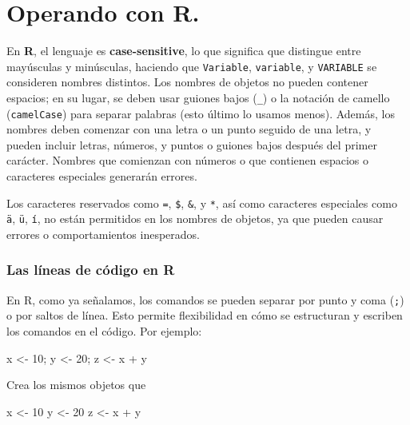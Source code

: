\documentclass[
  letterpaper,
]{scrbook}
\newenvironment{Shaded}{\begin{snugshade}}{\end{snugshade}}
\newcommand{\DecValTok}[1]{\textcolor[rgb]{0.68,0.00,0.00}{#1}}
\newcommand{\NormalTok}[1]{\textcolor[rgb]{0.00,0.23,0.31}{#1}}
\newcommand{\OtherTok}[1]{\textcolor[rgb]{0.00,0.23,0.31}{#1}}
\newcommand{\SpecialCharTok}[1]{\textcolor[rgb]{0.37,0.37,0.37}{#1}}
\begin{document}
\hypertarget{operando-con-r.}{%
\chapter{Operando con R.}\label{operando-con-r.}}

En \textbf{R}, el lenguaje es \textbf{case-sensitive}, lo que significa
que distingue entre mayúsculas y minúsculas, haciendo que
\texttt{Variable}, \texttt{variable}, y \texttt{VARIABLE} se consideren
nombres distintos. Los nombres de objetos no pueden contener espacios;
en su lugar, se deben usar guiones bajos (\texttt{\_}) o la notación de
camello (\texttt{camelCase}) para separar palabras (esto último lo
usamos menos). Además, los nombres deben comenzar con una letra o un
punto seguido de una letra, y pueden incluir letras, números, y puntos o
guiones bajos después del primer carácter. Nombres que comienzan con
números o que contienen espacios o caracteres especiales generarán
errores.

Los caracteres reservados como \texttt{=}, \texttt{\$}, \texttt{\&}, y
\texttt{*}, así como caracteres especiales como \texttt{ä}, \texttt{ü},
\texttt{í}, no están permitidos en los nombres de objetos, ya que pueden
causar errores o comportamientos inesperados.

\hypertarget{las-luxedneas-de-cuxf3digo-en-r}{%
\subsection{Las líneas de código en
R}\label{las-luxedneas-de-cuxf3digo-en-r}}

En R, como ya señalamos, los comandos se pueden separar por punto y coma
(\texttt{;}) o por saltos de línea. Esto permite flexibilidad en cómo se
estructuran y escriben los comandos en el código. Por ejemplo:

\begin{Shaded}
\begin{Highlighting}[]
\NormalTok{x }\OtherTok{\textless{}{-}} \DecValTok{10}\NormalTok{; y }\OtherTok{\textless{}{-}} \DecValTok{20}\NormalTok{; z }\OtherTok{\textless{}{-}}\NormalTok{ x }\SpecialCharTok{+}\NormalTok{ y}
\end{Highlighting}
\end{Shaded}

Crea los mismos objetos que

\begin{Shaded}
\begin{Highlighting}[]
\NormalTok{x }\OtherTok{\textless{}{-}} \DecValTok{10}
\NormalTok{y }\OtherTok{\textless{}{-}} \DecValTok{20}
\NormalTok{z }\OtherTok{\textless{}{-}}\NormalTok{ x }\SpecialCharTok{+}\NormalTok{ y}
\end{Highlighting}
\end{Shaded}
\end{document}
